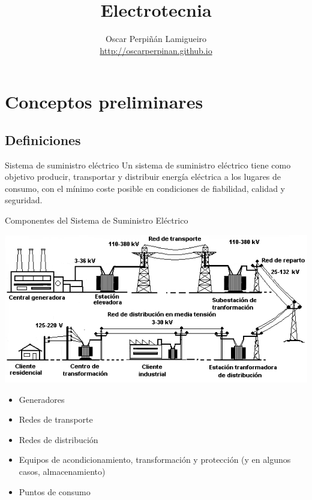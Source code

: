\documentclass[xcolor={usenames,svgnames,dvipsnames}]{beamer}
\author{Oscar Perpiñán Lamigueiro \\ \url{http://oscarperpinan.github.io}}
\date{}
\title{Electrotecnia}
\begin{document}
\maketitle

\section{Conceptos preliminares}
\label{sec:org97a0282}


\subsection{Definiciones}
\label{sec:orgeb12edf}


\begin{frame}[label={sec:orga4c14f4}]{Sistema de suministro eléctrico}
Un \alert{sistema de suministro eléctrico} tiene como objetivo \alert{producir,
transportar y distribuir energía eléctrica} a los lugares de consumo,
con el mínimo coste posible en condiciones de \alert{fiabilidad, calidad y
seguridad}.
\end{frame}

\begin{frame}[label={sec:orge23dda1}]{Componentes del Sistema de Suministro Eléctrico}
\begin{center}
\includegraphics[width=.9\linewidth]{../figs/Redelectrica2.png}
\end{center}

\begin{itemize}
\item Generadores

\item Redes de transporte

\item Redes de distribución

\item Equipos de acondicionamiento, transformación y protección (y en
algunos casos, almacenamiento)

\item Puntos de consumo
\end{itemize}
\end{frame}
\end{document}
